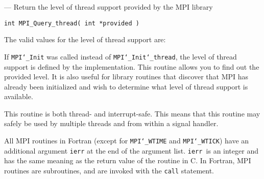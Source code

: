 \startmanpage
{}
--- Return the level of thread support provided by the MPI  library 
\startvb\begin{verbatim}
int MPI_Query_thread( int *provided )

\end{verbatim}
\endvb

\par
{}
The valid values for the level of thread support are:
\par
If {\tt MPI{\tt \char`\_}Init} was called instead of {\tt MPI{\tt \char`\_}Init{\tt \char`\_}thread}, the level of
thread support is defined by the implementation.  This routine allows
you to find out the provided level.  It is also useful for library
routines that discover that MPI has already been initialized and
wish to determine what level of thread support is available.
\par
{}
\par
This routine is both thread- and interrupt-safe.
This means that this routine may safely be used by multiple threads and
from within a signal handler.
\par
{}
All MPI routines in Fortran (except for {\tt MPI{\tt \char`\_}WTIME} and {\tt MPI{\tt \char`\_}WTICK}) have
an additional argument {\tt ierr} at the end of the argument list.  {\tt ierr
}is an integer and has the same meaning as the return value of the routine
in C.  In Fortran, MPI routines are subroutines, and are invoked with the
{\tt call} statement.
\par
